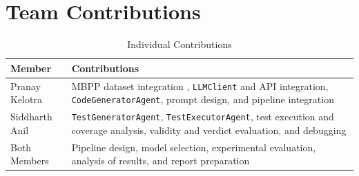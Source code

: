 \documentclass[12pt, a4paper]{article}
\begin{document}





\section{Team Contributions}
\label{sec:contributions}

\begin{table}[H]
\centering
\caption{Individual Contributions}
\begin{tabularx}{0.92\linewidth}{lX}
\toprule
\rowcolor{AccentA!10}
\textbf{Member} & \textbf{Contributions} \\
\midrule

Pranay Kelotra &
  MBPP dataset integration ,
  \texttt{LLMClient} and API integration,
  \texttt{CodeGeneratorAgent},
  prompt design, and pipeline integration \\

\addlinespace

Siddharth Anil &
  \texttt{TestGeneratorAgent},
  \texttt{TestExecutorAgent},
  test execution and coverage analysis,
  validity and verdict evaluation, and debugging \\

\addlinespace

Both Members &
  Pipeline design, model selection, experimental evaluation,
  analysis of results, and report preparation \\

\bottomrule
\end{tabularx}
\label{tab:contributions}
\end{table}
\end{document}
